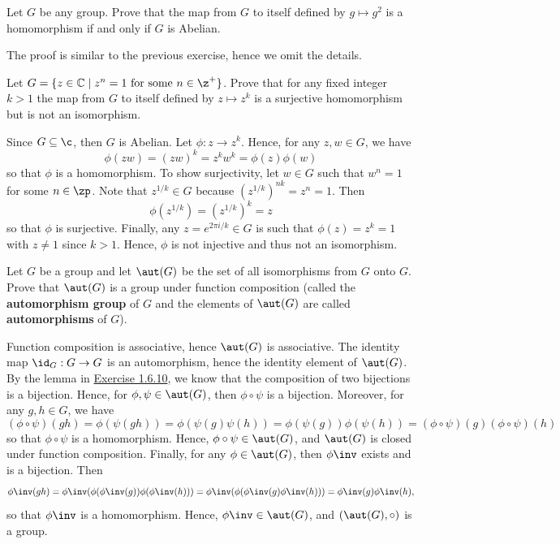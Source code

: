 \begin{exercise}\label{ex1.6.18}
    Let $G$ be any group. Prove that the map from $G$ to itself defined by $g \mapsto g^2$ is a homomorphism if and only if $G$ is Abelian.
\end{exercise}

\begin{sol}
    The proof is similar to the previous exercise, hence we omit the details.
\end{sol}

\begin{exercise}\label{ex1.6.19}
    Let $G = \{ z \in \mathbb{C} \mid z^n = 1 \text{ for some } n \in \z^+ \}$. Prove that for any fixed integer $k > 1$ the map from $G$ to itself defined by $z \mapsto z^k$ is a surjective homomorphism but is not an isomorphism.
\end{exercise}

\begin{sol}
    Since $G \subseteq \c$, then $G$ is Abelian. Let $\phi : z \to z^k$. Hence, for any $z, w \in G$, we have
    \[\phi(zw) = (zw)^k = z^kw^k = \phi(z)\phi(w)\]
    so that $\phi$ is a homomorphism. To show surjectivity, let $w \in G$ such that $w^n = 1$ for some $n \in \zp$. Note that $z^{1/k} \in G$ because $(z^{1/k})^{nk} = z^n = 1$. Then
    \[\phi(z^{1/k}) = (z^{1/k})^k = z\]
    so that $\phi$ is surjective. Finally, any $z = e^{2\pi i/k} \in G$ is such that $\phi(z) = z^k = 1$ with $z \neq 1$ since $k > 1$. Hence, $\phi$ is not injective and thus not an isomorphism.
\end{sol}

\begin{specialexercise}\label{ex1.6.20}
    Let $G$ be a group and let $\aut(G)$ be the set of all isomorphisms from $G$ onto $G$. Prove that $\aut(G)$ is a group under function composition (called the \textbf{automorphism group} of $G$ and the elements of $\aut(G)$ are called \textbf{automorphisms} of $G$).
\end{specialexercise}

\begin{sol}
    Function composition is associative, hence $\aut(G)$ is associative. The identity map $\id_G : G \to G$ is an automorphism, hence the identity element of $\aut(G)$. By the lemma in \hyperref[ex1.6.10]{Exercise 1.6.10}, we know that the composition of two bijections is a bijection. Hence, for $\phi, \psi \in \aut(G)$, then $\phi \circ \psi$ is a bijection. Moreover, for any $g, h \in G$, we have
    \[(\phi \circ \psi)(gh) = \phi(\psi(gh)) = \phi(\psi(g)\psi(h)) = \phi(\psi(g))\phi(\psi(h)) = (\phi \circ \psi)(g)(\phi \circ \psi)(h)\]
    so that $\phi \circ \psi$ is a homomorphism. Hence, $\phi \circ \psi \in \aut(G)$, and $\aut(G)$ is closed under function composition. Finally, for any $\phi \in \aut(G)$, then $\phi\inv$ exists and is a bijection. Then
    \[\phi\inv(gh) = \phi\inv(\phi(\phi\inv(g))\phi(\phi\inv(h))) = \phi\inv(\phi(\phi\inv(g)\phi\inv(h))) = \phi\inv(g)\phi\inv(h),\]
    so that $\phi\inv$ is a homomorphism. Hence, $\phi\inv \in \aut(G)$, and $(\aut(G), \circ)$ is a group.
\end{sol}

